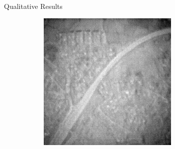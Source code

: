 \documentclass[final]{beamer}
\newlength{\colwidth}
\begin{document}
\begin{frame}[t]
\begin{columns}[t]
\begin{column}{\colwidth}
\begin{block}{Qualitative Results}
\begin{figure}
\begin{subfigure}[b]{0.19\textwidth}
        \end{subfigure}
        \hfill
        \begin{subfigure}[b]{0.19\textwidth}
            \centering
            \includegraphics[width=\textwidth]{../figs/outputs/mono/508.png}
        \end{subfigure}    
        

\end{figure}
\end{block}
\end{column}
\end{columns}
\end{frame}
\end{document}
